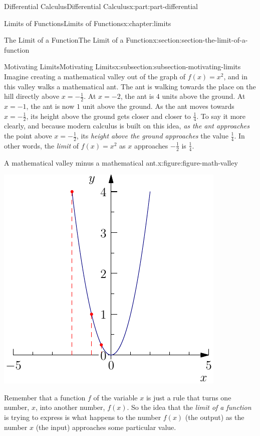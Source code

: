 \documentclass[twoside,10pt,]{tufte-book}
\numberwithin{equation}{part}
\begin{document}
\begin{partptx}{Differential Calculus}{}{Differential Calculus}{}{}{x:part:part-differential}
\begin{chapterptx}{Limits of Functions}{}{Limits of Functions}{}{}{x:chapter:limits}
\begin{sectionptx}{The Limit of a Function}{}{The Limit of a Function}{}{}{x:section:section-the-limit-of-a-function}
\begin{subsectionptx}{Motivating Limits}{}{Motivating Limits}{}{}{x:subsection:subsection-motivating-limits}
Imagine creating a mathematical valley out of the graph of \(f(x) = x^{2}\), and in this valley walks a mathematical ant. The ant is walking towards the place on the hill directly above \(x = -\frac{1}{2}\). At \(x=-2\), the ant is \(4\) units above the ground. At \(x=-1\), the ant is now \(1\) unit above the ground. As the ant moves towards \(x=-\frac{1}{2}\), its height above the ground gets closer and closer to \(\frac{1}{4}\). To say it more clearly, and because modern calculus is built on this idea, \emph{as the ant approaches} the point above \(x = -\frac{1}{2}\), its \emph{height above the ground approaches} the value \(\frac{1}{4}\). In other words, the \emph{limit} of \(f(x) = x^{2}\) as \(x\) approaches \(-\frac{1}{2}\) is \(\frac{1}{4}\).%
\begin{figureptx}{A mathematical valley minus a mathematical ant.}{x:figure:figure-math-valley}{}%
\begin{image}{0.25}{0.5}{0.25}%
\includegraphics[width=\linewidth]{generated/asymptote/image-1.pdf}
\end{image}%
\tcblower
\end{figureptx}%
Remember that a function \(f\) of the variable \(x\) is just a rule that turns one number, \(x\), into another number, \(f(x)\). So the idea that the \emph{limit of a function} is trying to express is what happens to the number \(f(x)\) (the output) as the number \(x\) (the input) approaches some particular value.%

\end{subsectionptx}
\end{sectionptx}
\end{chapterptx}
\end{partptx}
\end{document}
